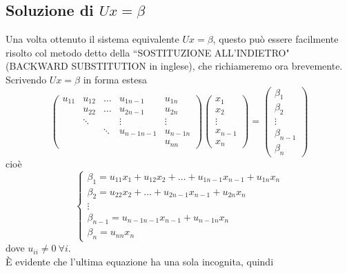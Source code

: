 \documentclass[12pt,a4paper]{article}
\begin{document}
\subsection{Soluzione di $Ux=\beta$}
Una volta ottenuto il sistema equivalente $Ux=\beta$, questo può essere facilmente risolto col metodo detto della ``SOSTITUZIONE ALL'INDIETRO" (BACKWARD SUBSTITUTION in inglese), che richiameremo ora brevemente. \\
Scrivendo $Ux=\beta$ in forma estesa
\begin{equation*}
    \begin{pmatrix}
        u_{11} & u_{12} & \dots & u_{1n-1} & u_{1n} \\ 
        & u_{22} & \dots & u_{2n-1} & u_{2n} \\ 
        & \ddots &  & \vdots & \vdots \\ 
        &  & \ddots  & u_{n-1n-1} & u_{n-1n} \\ 
        &  &  &  & u_{nn} 
    \end{pmatrix} 
    \begin{pmatrix}
        x_1 \\ 
        x_2 \\ 
        \vdots \\ 
        x_{n-1} \\ 
        x_n 
    \end{pmatrix} = 
    \begin{pmatrix}
        \beta_1 \\ 
        \beta_2 \\ 
        \vdots \\ 
        \beta_{n-1} \\ 
        \beta_n 
    \end{pmatrix}
\end{equation*}
cioè
\begin{equation*}
    \begin{cases}
        \beta_1 = u_{11}x_1 +u_{12}x_2 + \dots + u_{1n-1}x_{n-1} + u_{1n}x_n\\ 
        \beta_2 = u_{22}x_2 + \dots +u_{2n-1}x_{n-1} + u_{2n}x_n\\ 
        \vdots  \\ 
        \beta_{n-1} = u_{n-1n-1}x_{n-1} + u_{n-1n}x_n\\ 
        \beta_{n} = u_{nn}x_n
\end{cases}
\end{equation*}
dove $u_{ii}\neq 0 \ \forall i$.\\
È evidente che l'ultima equazione ha una sola incognita, quindi 
\end{document}

